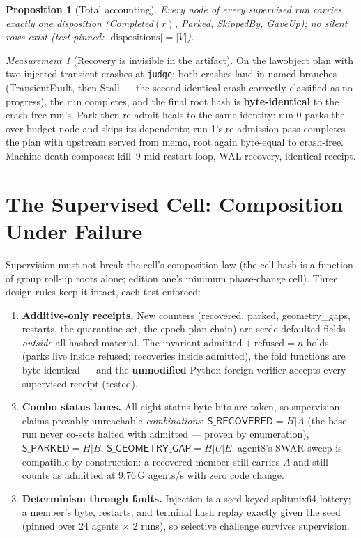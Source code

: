 \documentclass[11pt,a4paper]{article}
\newtheorem{proposition}[theorem]{Proposition}
\theoremstyle{definition}
\theoremstyle{remark}
\newtheorem{measurement}[theorem]{Measurement}
\begin{document}
\begin{proposition}[Total accounting]
Every node of every supervised run carries exactly one disposition
(\textsf{Completed}$(r)$, \textsf{Parked}, \textsf{SkippedBy},
\textsf{GaveUp}); no silent rows exist (test-pinned:
$|\mathrm{dispositions}| = |V|$).
\end{proposition}

\begin{measurement}[Recovery is invisible in the artifact]
On the lawobject plan with two injected transient crashes at \texttt{judge}:
both crashes land in named branches (\textsf{TransientFault}, then
\textsf{Stall} --- the second identical crash correctly classified as
no-progress), the run completes, and the final root hash is
\textbf{byte-identical} to the crash-free run's. Park-then-re-admit heals
to the same identity: run 0 parks the over-budget node and skips its
dependents; run 1's re-admission pass completes the plan with upstream
served from memo, root again byte-equal to crash-free. Machine death
composes: kill\,-9 mid-restart-loop, WAL recovery, identical receipt.
\end{measurement}

\section{The Supervised Cell: Composition Under Failure}

Supervision must not break the cell's composition law (the cell hash is a
function of group roll-up roots alone; edition one's minimum
phase-change cell). Three design rules keep it intact, each test-enforced:

\begin{enumerate}[leftmargin=1.6em]
\item \textbf{Additive-only receipts.} New counters
(\textsf{recovered}, \textsf{parked}, \textsf{geometry\_gaps},
\textsf{restarts}, the quarantine set, the epoch-plan chain) are
serde-defaulted fields \emph{outside} all hashed material. The invariant
$\mathrm{admitted} + \mathrm{refused} = n$ holds (parks live inside
refused; recoveries inside admitted), the fold functions are
byte-identical --- and the \textbf{unmodified} Python foreign verifier
accepts every supervised receipt (tested).
\item \textbf{Combo status lanes.} All eight status-byte bits are taken,
so supervision claims provably-unreachable \emph{combinations}:
$\textsf{S\_RECOVERED} = H|A$ (the base run never co-sets halted with
admitted --- proven by enumeration), $\textsf{S\_PARKED} = H|B$,
$\textsf{S\_GEOMETRY\_GAP} = H|U|E$. agent8's SWAR sweep is compatible by
construction: a recovered member still carries $A$ and still counts as
admitted at 9.76\,G agents/s with zero code change.
\item \textbf{Determinism through faults.} Injection is a seed-keyed
splitmix64 lottery; a member's byte, restarts, and terminal hash replay
exactly given the seed (pinned over 24 agents $\times$ 2 runs), so
selective challenge survives supervision.
\end{enumerate}
\end{document}
